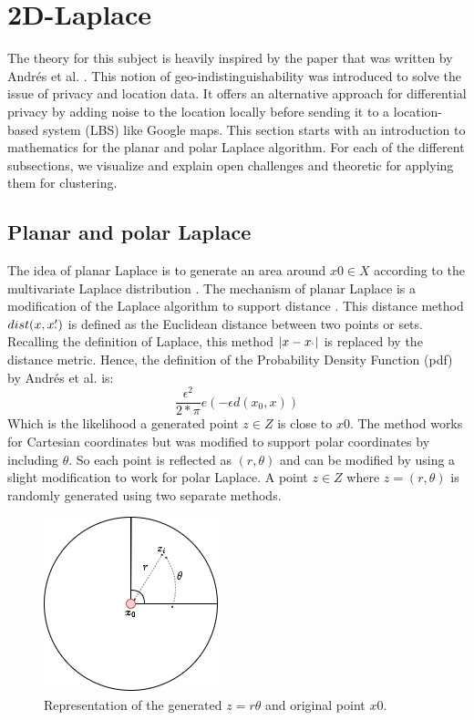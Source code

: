 
\section{2D-Laplace}
The theory for this subject is heavily inspired by the paper that was written by Andrés et al. \citep{DBLP:journals/corr/abs-1212-1984}.
This notion of geo-indistinguishability was introduced to solve the issue of privacy and location data.
It offers an alternative approach for differential privacy by adding noise to the location locally before sending it to a location-based system (LBS) like Google maps.
This section starts with an introduction to mathematics for the planar and polar Laplace algorithm.
For each of the different subsections, we visualize and explain open challenges and theoretic for applying them for clustering.
\glsaddall
\leading{10pt}
\printglossary[type=genericmath, nonumberlist]

\subsection{Planar and polar Laplace}
\printglossary[type=2dlaplace]

The idea of planar Laplace is to generate an area around $x0 \in X$ according to the multivariate Laplace distribution .
The mechanism of planar Laplace is a modification of the Laplace algorithm to support distance \citep{DBLP:journals/corr/abs-1212-1984}.
This distance method $dist(x, x_`')$ is defined as the Euclidean distance  between two points or sets.
Recalling the definition of Laplace, this method $|x-x_`|$ is replaced by the distance metric.
Hence, the definition of the Probability Density Function (pdf) by Andrés et al. is:
\begin{equation}
  \frac{\epsilon^2}{2*\pi}e(-\epsilon d(x_0, x))
\end{equation}
Which is the likelihood a generated point $z \in Z$ is close to $x0$.
The method works for Cartesian coordinates but was modified to support polar coordinates by including $\theta$.
So each point is reflected as $(r, \theta)$ and can be modified by using a slight modification to work for polar Laplace.
\newpage
A point $z \in Z$ where $z = (r, \theta)$ is randomly generated using two separate methods.
\begin{figure}[h] \label{figure:parea}
  \includegraphics[scale=0.6]{TheorethicalFramework/ND-Laplace/Images/polar-laplace.png}
  \centering
  \caption{Representation of the generated $z = {r \theta}$ and original point $x0$.}
\end{figure}

